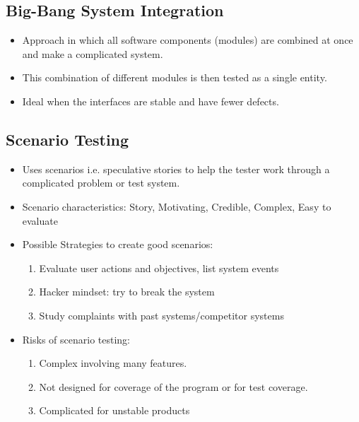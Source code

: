 \documentclass{article}
\begin{document}
\subsection{Big-Bang System Integration}
\begin{itemize}
    \item Approach in which all software components (modules) are combined at once and make a complicated system. 
    
    \item This combination of different modules is then tested as a single entity. 
    
    \item Ideal when the interfaces are stable and have fewer defects.
\end{itemize}

\subsection{Scenario Testing}
\begin{itemize}
    \item Uses scenarios i.e. speculative stories to help the tester work through a complicated problem or test system. 
    
    \item Scenario characteristics: Story, Motivating, Credible, Complex, Easy to evaluate

    
    \item Possible Strategies to create good scenarios: 
    \begin{enumerate}
        \item Evaluate user actions and objectives, list system events
        
        \item Hacker mindset: try to break the system
        
        \item Study complaints with past systems/competitor systems
    \end{enumerate}
    
    \item Risks of scenario testing:
    \begin{enumerate}
        \item Complex involving many features.
        
        \item Not designed for coverage of the program or for test coverage.
        
        \item Complicated for unstable products
    \end{enumerate}
\end{itemize}
\end{document}
